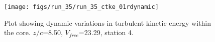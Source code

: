 \begin{figure}[H]
\centering
\texttt{[image: figs/run\_35/run\_35\_ctke\_01rdynamic]}
\caption{Plot showing dynamic variations in turbulent kinetic energy within the core. $z/c$=8.50, $V_{free}$=23.29, station 4.}
\label{fig:run_35_ctke_01rdynamic}
\end{figure}


